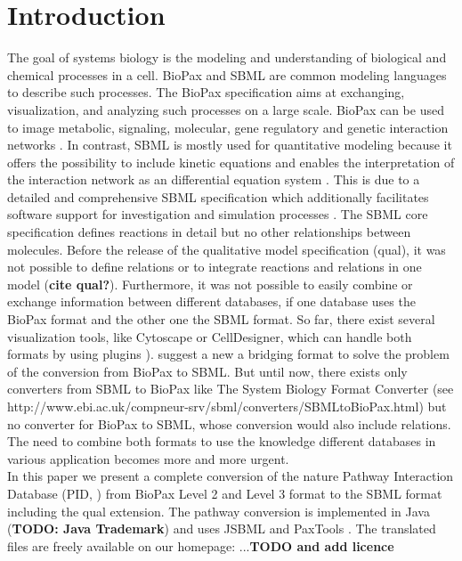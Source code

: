 \documentclass{bioinfo}
\begin{document}
\section{Introduction}
The goal of systems biology is the modeling and understanding of biological and chemical processes in a cell. BioPax and SBML are common modeling languages to describe such processes. The BioPax specification aims at exchanging, visualization, and analyzing such processes on a large scale. BioPax can be used to image metabolic, signaling, molecular, gene regulatory and genetic interaction networks \citep{Demir2010}. In contrast, SBML is mostly used for quantitative modeling because it offers the possibility to include kinetic equations and enables the interpretation of the interaction network as an differential equation system \citep{Hucka2003}. This is due to a detailed and comprehensive SBML specification which additionally facilitates software support for investigation and simulation processes \citep{Draeger2008}. The SBML core specification defines reactions in detail but no other relationships between molecules.
Before the release of the qualitative model specification (qual), it was not possible to define relations or to integrate reactions and relations in one model (\textbf{cite qual?}).
Furthermore, it was not possible to easily combine or exchange information between different databases, if one database uses the BioPax format and the other one the SBML format.
So far, there exist several visualization tools, like Cytoscape or CellDesigner, which can handle both formats by using plugins \citep{Mi2011, Draeger2008, Funahashi2007, Smoot2011a, Zinovyev2008}). \citet*{Ruebenacker2009} suggest a new a bridging format to solve the problem of the conversion from BioPax to SBML. But until now, there exists only converters from SBML to BioPax like The System Biology Format Converter (see http://www.ebi.ac.uk/compneur-srv/sbml/converters/SBMLtoBioPax.html) but no converter for BioPax to SBML, whose conversion would also include relations. The need to combine both formats to use the knowledge different databases in various application becomes more and more urgent.\\
In this paper we present a complete conversion of the nature Pathway Interaction Database (PID, \citet{Schaefer2009}) from BioPax Level 2 and Level 3 format to the SBML format including the qual extension. The pathway conversion is implemented in Java (\textbf{TODO: Java Trademark}) and uses JSBML \citep{Draeger2011} and PaxTools \citep{Demir2010}. The translated files are freely available on our homepage: ...\textbf{TODO and add licence}
\end{document}
